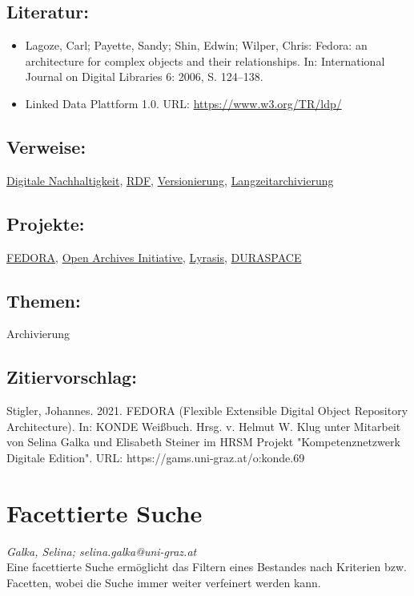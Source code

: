 \documentclass{article}
\begin{document}
        \subsection*{Literatur:}\begin{itemize}\item Lagoze, Carl; Payette, Sandy; Shin, Edwin; Wilper, Chris: Fedora: an architecture for complex objects and their relationships. In: International Journal on Digital Libraries 6: 2006, S. 124–138.\item Linked Data Plattform 1.0. URL: \url{https://www.w3.org/TR/ldp/}\end{itemize}\subsection*{Verweise:}\href{https://gams.uni-graz.at/o:konde.6}{Digitale Nachhaltigkeit}, \href{https://gams.uni-graz.at/o:konde.131}{RDF}, \href{https://gams.uni-graz.at/o:konde.14}{Versionierung}, \href{https://gams.uni-graz.at/o:konde.114}{Langzeitarchivierung}\subsection*{Projekte:}\href{https://duraspace.org/fedora/}{FEDORA}, \href{http://openarchives.org/}{Open Archives Initiative}, \href{http://lyrasis.org}{Lyrasis}, \href{https://duraspace.org/fedora/}{DURASPACE}\subsection*{Themen:}Archivierung\subsection*{Zitiervorschlag:}Stigler, Johannes. 2021. FEDORA (Flexible Extensible Digital Object Repository Architecture). In: KONDE Weißbuch. Hrsg. v. Helmut W. Klug unter Mitarbeit von Selina Galka und Elisabeth Steiner im HRSM Projekt "Kompetenznetzwerk Digitale Edition". URL: https://gams.uni-graz.at/o:konde.69\newpage\section*{Facettierte Suche} \emph{Galka, Selina; selina.galka@uni-graz.at }\\
        
    Eine facettierte Suche ermöglicht das Filtern eines Bestandes nach Kriterien bzw. Facetten, wobei die Suche immer weiter verfeinert werden kann.\\
            
\end{document}
